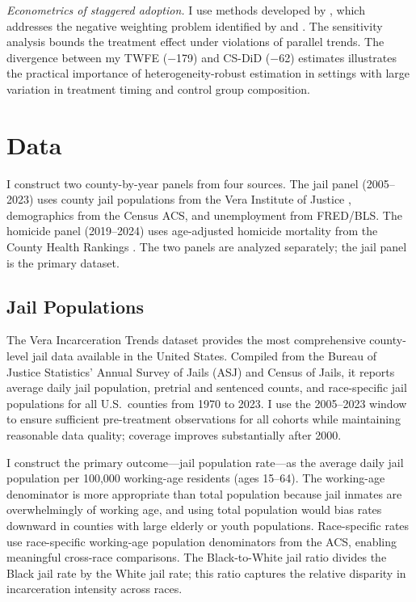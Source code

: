 \documentclass[12pt]{article}
\begin{document}
\textit{Econometrics of staggered adoption.} I use methods developed by \citet{callaway2021did}, which addresses the negative weighting problem identified by \citet{goodmanbacon2021did} and \citet{dechaisemartin2020two}. The \citet{rambachan2023honest} sensitivity analysis bounds the treatment effect under violations of parallel trends. The divergence between my TWFE ($-$179) and CS-DiD ($-$62) estimates illustrates the practical importance of heterogeneity-robust estimation in settings with large variation in treatment timing and control group composition.


\section{Data}
\label{sec:data}

I construct two county-by-year panels from four sources. The jail panel (2005--2023) uses county jail populations from the Vera Institute of Justice \citep{vera2024incarceration}, demographics from the Census ACS, and unemployment from FRED/BLS. The homicide panel (2019--2024) uses age-adjusted homicide mortality from the County Health Rankings \citep{chr2024}. The two panels are analyzed separately; the jail panel is the primary dataset.

\subsection{Jail Populations}

The Vera Incarceration Trends dataset provides the most comprehensive county-level jail data available in the United States. Compiled from the Bureau of Justice Statistics' Annual Survey of Jails (ASJ) and Census of Jails, it reports average daily jail population, pretrial and sentenced counts, and race-specific jail populations for all U.S.\ counties from 1970 to 2023. I use the 2005--2023 window to ensure sufficient pre-treatment observations for all cohorts while maintaining reasonable data quality; coverage improves substantially after 2000.

I construct the primary outcome---jail population rate---as the average daily jail population per 100,000 working-age residents (ages 15--64). The working-age denominator is more appropriate than total population because jail inmates are overwhelmingly of working age, and using total population would bias rates downward in counties with large elderly or youth populations. Race-specific rates use race-specific working-age population denominators from the ACS, enabling meaningful cross-race comparisons. The Black-to-White jail ratio divides the Black jail rate by the White jail rate; this ratio captures the relative disparity in incarceration intensity across races.
\end{document}
